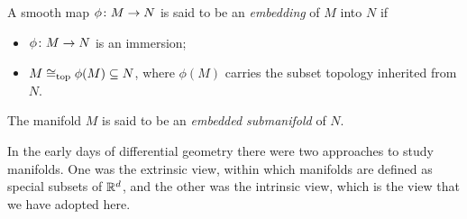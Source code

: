 
\bd
A smooth map $\phi\colon M \to N$ is said to be an \emph{embedding} of $M$ into $N$ if
\begin{itemize}
\item $\phi\colon M\to N$ is an immersion;
\item $M \cong_{\mathrm{top}}\phi(M)\subseteq N$, where $\phi(M)$ carries the subset topology inherited from $N$.
\end{itemize}
The manifold $M$ is said to be an \emph{embedded submanifold} of $N$.
\ed

In the early days of differential geometry there were two approaches to study manifolds. One was the extrinsic view, within which manifolds are defined as special subsets of $\mathbb{R}^d$, and the other was the intrinsic view, which is the view that we have adopted here.

